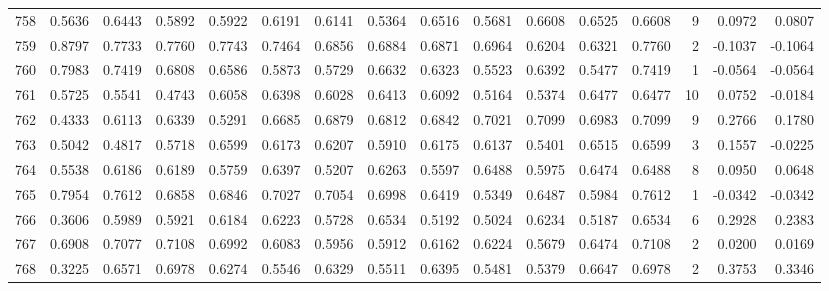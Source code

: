 \begin{tabular}{lrrrrrrrrrrrrrrr}
758 &      0.5636 &  0.6443 &  0.5892 &  0.5922 &  0.6191 &  0.6141 &  0.5364 &  0.6516 &  0.5681 &  0.6608 &   0.6525 &     0.6608 &      9 &                    0.0972 &                     0.0807 \\
759 &      0.8797 &  0.7733 &  0.7760 &  0.7743 &  0.7464 &  0.6856 &  0.6884 &  0.6871 &  0.6964 &  0.6204 &   0.6321 &     0.7760 &      2 &                   -0.1037 &                    -0.1064 \\
760 &      0.7983 &  0.7419 &  0.6808 &  0.6586 &  0.5873 &  0.5729 &  0.6632 &  0.6323 &  0.5523 &  0.6392 &   0.5477 &     0.7419 &      1 &                   -0.0564 &                    -0.0564 \\
761 &      0.5725 &  0.5541 &  0.4743 &  0.6058 &  0.6398 &  0.6028 &  0.6413 &  0.6092 &  0.5164 &  0.5374 &   0.6477 &     0.6477 &     10 &                    0.0752 &                    -0.0184 \\
762 &      0.4333 &  0.6113 &  0.6339 &  0.5291 &  0.6685 &  0.6879 &  0.6812 &  0.6842 &  0.7021 &  0.7099 &   0.6983 &     0.7099 &      9 &                    0.2766 &                     0.1780 \\
763 &      0.5042 &  0.4817 &  0.5718 &  0.6599 &  0.6173 &  0.6207 &  0.5910 &  0.6175 &  0.6137 &  0.5401 &   0.6515 &     0.6599 &      3 &                    0.1557 &                    -0.0225 \\
764 &      0.5538 &  0.6186 &  0.6189 &  0.5759 &  0.6397 &  0.5207 &  0.6263 &  0.5597 &  0.6488 &  0.5975 &   0.6474 &     0.6488 &      8 &                    0.0950 &                     0.0648 \\
765 &      0.7954 &  0.7612 &  0.6858 &  0.6846 &  0.7027 &  0.7054 &  0.6998 &  0.6419 &  0.5349 &  0.6487 &   0.5984 &     0.7612 &      1 &                   -0.0342 &                    -0.0342 \\
766 &      0.3606 &  0.5989 &  0.5921 &  0.6184 &  0.6223 &  0.5728 &  0.6534 &  0.5192 &  0.5024 &  0.6234 &   0.5187 &     0.6534 &      6 &                    0.2928 &                     0.2383 \\
767 &      0.6908 &  0.7077 &  0.7108 &  0.6992 &  0.6083 &  0.5956 &  0.5912 &  0.6162 &  0.6224 &  0.5679 &   0.6474 &     0.7108 &      2 &                    0.0200 &                     0.0169 \\
768 &      0.3225 &  0.6571 &  0.6978 &  0.6274 &  0.5546 &  0.6329 &  0.5511 &  0.6395 &  0.5481 &  0.5379 &   0.6647 &     0.6978 &      2 &                    0.3753 &                     0.3346 \\

\end{tabular}
